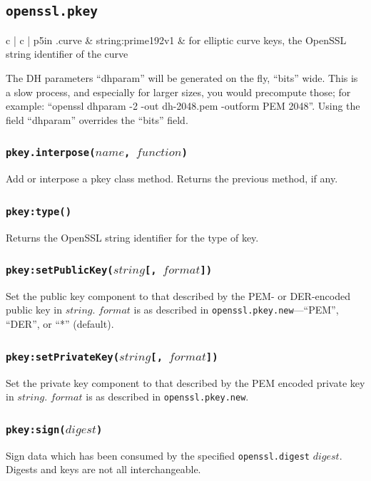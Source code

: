 \documentclass[11pt, oneside]{memoir}
\newcommand*{\fn}[1]{\texttt{#1}\xspace}
\newcommand*{\module}[1]{\texttt{#1}\xspace}
\newcounter{toccols}
\newenvironment{Module}[1]{
	\subsection{\texttt{#1}}
	\addtocontents{toc}{
		\protect\begin{multicols}{\value{toccols}}
	}
}{
	\addtocontents{toc}{\protect\end{multicols}}
}
\begin{document}
\begin{Module}{openssl.pkey}
\begin{ctabular}{ c | c | p{5in}}
.curve & string:prime192v1 & for elliptic curve keys, the OpenSSL string identifier of the curve
\end{ctabular}

The DH parameters ``dhparam'' will be generated on the fly, ``bits'' wide. This is a slow process, and especially for larger sizes, you would precompute those; for example: ``openssl dhparam -2 -out dh-2048.pem -outform PEM 2048''. Using the field ``dhparam'' overrides the ``bits'' field.

\subsubsection[\fn{pkey.interpose}]{\fn{pkey.interpose($name$, $function$)}}

Add or interpose a pkey class method. Returns the previous method, if any.

\subsubsection[\fn{pkey:type}]{\fn{pkey:type()}}

Returns the OpenSSL string identifier for the type of key.

\subsubsection[\fn{pkey:setPublicKey}]{\fn{pkey:setPublicKey($string$[, $format$])}}

Set the public key component to that described by the PEM- or DER-encoded public key in $string$. $format$ is as described in \fn{openssl.pkey.new}---``PEM'', ``DER'', or ``*'' (default).

\subsubsection[\fn{pkey:setPrivateKey}]{\fn{pkey:setPrivateKey($string$[, $format$])}}

Set the private key component to that described by the PEM encoded private key in $string$. $format$ is as described in \fn{openssl.pkey.new}.

\subsubsection[\fn{pkey:sign}]{\fn{pkey:sign($digest$)}}

Sign data which has been consumed by the specified \module{openssl.digest} $digest$. Digests and keys are not all interchangeable.


\end{Module}
\end{document}
